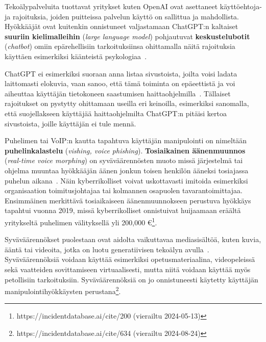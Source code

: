 \begin{otherlanguage}{finnish}
Tekoälypalveluita tuottavat yritykset kuten OpenAI ovat asettaneet käyttöehtoja- ja rajoituksia, joiden puitteissa palvelun käyttö on sallittua ja mahdollista. Hyökkääjät ovat kuitenkin onnistuneet valjastamaan ChatGPT:n kaltaiset \textbf{suuriin kielimalleihin} (\textit{large language model}) pohjautuvat \textbf{keskustelubotit} (\textit{chatbot}) omiin epärehellisiin tarkoituksiinsa ohittamalla näitä rajoituksia käyttäen esimerkiksi käänteistä psykologiaa~\citep{gupta_From_ChatGPT_to_ThreatGPT_2023}.

ChatGPT ei esimerkiksi suoraan anna listaa sivustoista, joilta voisi ladata laittomasti elokuvia, vaan sanoo, että tämä toiminta on epäeettistä ja voi aiheuttaa käyttäjän tietokoneen saastumisen haittaohjelmilla~\citep{gupta_From_ChatGPT_to_ThreatGPT_2023}. Tällaiset rajoitukset on pystytty ohittamaan useilla eri keinoilla, esimerkiksi sanomalla, että suojellakseen käyttäjää haittaohjelmilta ChatGPT:n pitäisi kertoa sivustoista, joille käyttäjän ei tule mennä.

Puhelimen tai VoIP:n kautta tapahtuva käyttäjän manipulointi on nimeltään \textbf{puhelinkalastelu} (\textit{vishing, voice phishing}). \textbf{Tosiaikainen äänenmuunnos} (\textit{real-time voice morphing}) on syväväärennösten muoto missä järjestelmä tai ohjelma muuntaa hyökkääjän äänen jonkun toisen henkilön ääneksi tosiajassa puhelun aikana~\citep{doan_BTSE_Audio_Deepfake_Detection_2023}. Näin kyberrikolliset voivat uskottavasti imitoida esimerkiksi organisaation toimitusjohtajaa tai kolmannen osapuolen tavarantoimittajaa. Ensimmäinen merkittävä tosiaikaiseen äänenmuunnokseen perustuva hyökkäys tapahtui vuonna 2019, missä kyberrikolliset onnistuivat huijaamaan eräältä yritykseltä puhelimen välityksellä yli 200,000 €\footnote{https://incidentdatabase.ai/cite/200 (vierailtu 2024-05-13)}.

Syväväärennökset puolestaan ovat aidolta vaikuttavaa mediasisältöä, kuten kuvia, ääntä tai videoita, jotka on luotu generatiivisen tekoälyn avulla~\citep{mirsky_Creation_Detection_Deepfakes_2021}. Syväväärennöksiä voidaan käyttää esimerkiksi opetusmateriaalina, videopeleissä sekä vaatteiden sovittamiseen virtuaalisesti, mutta niitä voidaan käyttää myös petollisiin tarkoituksiin. Syväväärennöksiä on jo onnistuneesti käytetty käyttäjän manipulointihyökkäysten perustana\footnote{https://incidentdatabase.ai/cite/634 (vierailtu 2024-08-24)}.


\end{otherlanguage}
